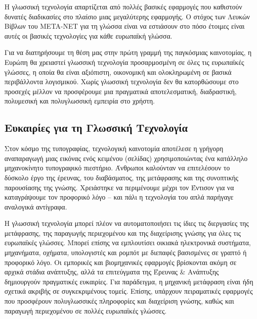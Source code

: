 \documentclass[]{../../metanetpaper}
\begin{document}
\begin{multicols}{2}
Η γλωσσική τεχνολογία απαρτίζεται από πολλές βασικές εφαρμογές που καθιστούν δυνατές διαδικασίες στο πλαίσιο μιας μεγαλύτερης εφαρμογής. Ο στόχος των Λευκών Βίβλων του META-NET για τη γλώσσα είναι να εστιάσουν στο πόσο έτοιμες είναι αυτές οι βασικές τεχνολογίες για κάθε ευρωπαϊκή γλώσσα. 


Για να διατηρήσουμε τη θέση μας στην πρώτη γραμμή της παγκόσμιας καινοτομίας, η Ευρώπη θα χρειαστεί γλωσσική τεχνολογία προσαρμοσμένη σε όλες τις ευρωπαϊκές γλώσσες, η οποία θα είναι αξιόπιστη, οικονομική και ολοκληρωμένη σε βασικά περιβάλλοντα λογισμικού. Χωρίς γλωσσική τεχνολογία δεν θα κατορθώσουμε στο προσεχές μέλλον να προσφέρουμε μια πραγματικά αποτελεσματική, διαδραστική, πολυμεσική και πολυγλωσσική εμπειρία στο χρήστη.

\subsection{Ευκαιρίες για τη Γλωσσική Τεχνολογία}

Στον κόσμο της τυπογραφίας, τεχνολογική καινοτομία αποτέλεσε η γρήγορη αναπαραγωγή μιας εικόνας ενός κειμένου (σελίδας) χρησιμοποιώντας ένα κατάλληλο μηχανοκίνητο τυπογραφικό πιεστήριο. Άνθρωποι καλούνταν να επιτελέσουν το δύσκολο έργο της έρευνας, του διαβάσματος, της μετάφρασης και της συνοπτικής παρουσίασης της γνώσης. Χρειάστηκε να περιμένουμε μέχρι τον Έντισον για να καταγράψουμε τον προφορικό λόγο – και πάλι η τεχνολογία του απλά παρήγαγε αναλογικά αντίγραφα.

Η γλωσσική τεχνολογία μπορεί πλέον να αυτοματοποιήσει τις ίδιες τις διεργασίες της μετάφρασης, της παραγωγής περιεχομένου και της διαχείρισης γνώσης για όλες τις ευρωπαϊκές γλώσσες. Μπορεί επίσης να εμπλουτίσει οικιακά ηλεκτρονικά συστήματα, μηχανήματα, οχήματα, υπολογιστές και ρομπότ με διεπαφές βασισμένες σε γραπτό ή προφορικό λόγο. Οι εμπορικές και βιομηχανικές εφαρμογές βρίσκονται ακόμη σε αρχικά στάδια ανάπτυξης, αλλά τα επιτεύγματα της Έρευνας \& Ανάπτυξης δημιουργούν πραγματικές ευκαιρίες. Για παράδειγμα, η μηχανική μετάφραση είναι ήδη σχετικά ακριβής σε συγκεκριμένους τομείς. Επίσης, υπάρχουν πειραματικές εφαρμογές που προσφέρουν πολυγλωσσικές πληροφορίες και διαχείριση γνώσης, καθώς και παραγωγή περιεχομένου σε πολλές ευρωπαϊκές γλώσσες.


\end{multicols}
\end{document}
